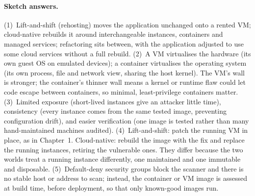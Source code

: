 \paragraph{Sketch answers.}
{\small
(1)~Lift-and-shift (rehosting) moves the application unchanged onto a rented
VM; cloud-native rebuilds it around interchangeable instances, containers and
managed services; refactoring sits between, with the application adjusted to
use some cloud services without a full rebuild. (2)~A VM virtualises the
hardware (its own guest OS on emulated devices); a container virtualises the
operating system (its own process, file and network view, sharing the host
kernel). The VM's wall is stronger; the container's thinner wall means a
kernel or runtime flaw could let code escape between containers, so minimal,
least-privilege containers matter. (3)~Limited exposure (short-lived instances
give an attacker little time), consistency (every instance comes from the same
tested image, preventing configuration drift), and easier verification (one
image is tested rather than many hand-maintained machines audited).
(4)~Lift-and-shift: patch the running VM in place, as in Chapter~1.
Cloud-native: rebuild the image with the fix and replace the running
instances, retiring the vulnerable ones. They differ because the two worlds
treat a running instance differently, one maintained and one immutable and
disposable. (5)~Default-deny security groups block the scanner and there is no
stable host or address to scan; instead, the container or VM image is assessed
at build time, before deployment, so that only known-good images run.}


